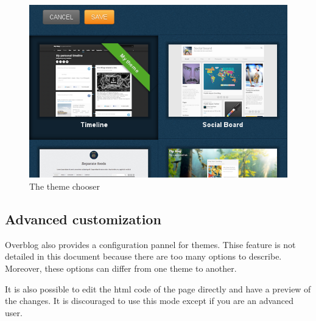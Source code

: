 \documentclass[a4paper,10pt]{article}
\begin{document}
\begin{figure}[htpb]
 \centering
 \includegraphics[scale=0.43]{Images/ChooseYourTheme.png}
 \caption{The theme chooser}
 \label{customHeader}
\end{figure}

\subsection{Advanced customization}

Overblog also provides a configuration pannel for themes. Thise feature is not detailed in this document because there are too many options to describe. Moreover, these options can differ from one theme to another. 

It is also possible to edit the html code of the page directly and have a preview of the changes. It is discouraged to use this mode except if you are an advanced user. 

\end{document}
